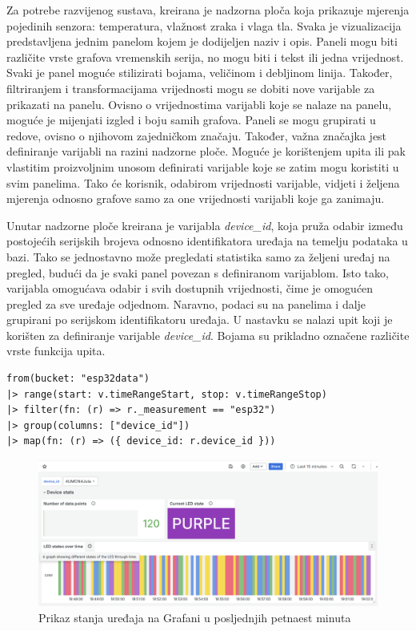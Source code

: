 Za potrebe razvijenog sustava, kreirana je nadzorna ploča koja prikazuje mjerenja pojedinih senzora: temperatura, vlažnost zraka i vlaga tla.  Svaka je vizualizacija predstavljena jednim panelom kojem je dodijeljen naziv i opis. Paneli mogu biti različite vrste grafova vremenskih serija, no mogu biti i tekst ili jedna vrijednost. Svaki je panel moguće stilizirati bojama, veličinom i debljinom linija. Također, filtriranjem i transformacijama vrijednosti mogu se dobiti nove varijable za prikazati na panelu. Ovisno o vrijednostima varijabli koje se nalaze na panelu, moguće je mijenjati izgled i boju samih grafova. Paneli se mogu grupirati u redove, ovisno o njihovom zajedničkom značaju. Također, važna značajka jest definiranje varijabli na razini nadzorne ploče. Moguće je korištenjem upita ili pak vlastitim proizvoljnim unosom definirati varijable koje se zatim mogu koristiti u svim panelima. Tako će korisnik, odabirom vrijednosti varijable, vidjeti i željena mjerenja odnosno grafove samo za one vrijednosti varijabli koje ga zanimaju.

Unutar nadzorne ploče kreirana je varijabla \textit{device\_id}, koja pruža odabir između postojećih serijskih brojeva odnosno identifikatora uređaja na temelju podataka u bazi. Tako se jednostavno može pregledati statistika samo za željeni uređaj na pregled, budući da je svaki panel povezan s definiranom varijablom. Isto tako, varijabla omogućava odabir i svih dostupnih vrijednosti, čime je omogućen pregled za sve uređaje odjednom. Naravno, podaci su na panelima i dalje grupirani po serijskom identifikatoru uređaja. U nastavku se nalazi upit koji je korišten za definiranje varijable \textit{device\_id}. Bojama su prikladno označene različite vrste funkcija upita. 

\begin{lstlisting}[caption={Upit za dohvat identifikatora uređaja}, language=flux]
from(bucket: "esp32data")
|> range(start: v.timeRangeStart, stop: v.timeRangeStop)
|> filter(fn: (r) => r._measurement == "esp32")
|> group(columns: ["device_id"])
|> map(fn: (r) => ({ device_id: r.device_id }))
\end{lstlisting}

\begin{figure}[ht]
	\centering
	\includegraphics[scale=0.4]{imgs/grafana_device_stats}
	\caption{Prikaz stanja uređaja na Grafani u posljednjih petnaest minuta}
	\label{fig:grafana_device_stats}
\end{figure}

